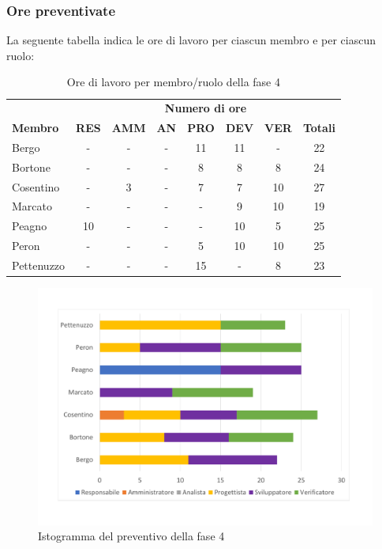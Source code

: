 	\subsubsection{Ore preventivate}
		La seguente tabella indica le ore di lavoro per ciascun membro e per ciascun ruolo:
		\begin{table}[H]
			\centering
			\begin{tabular}{| l | c c c c c c | c |}
				\rowcolor{LightBlue}
				& \multicolumn{7}{c}{\textbf{\color{white}Numero di ore}}	\\
		
				\rowcolor{LightBlue}
				\textbf{\color{white}Membro}
				& \textbf{\color{white}RES}
				& \textbf{\color{white}AMM}
				& \textbf{\color{white}AN}
				& \textbf{\color{white}PRO}
				& \textbf{\color{white}DEV}
				& \textbf{\color{white}VER}
				& \textbf{\color{white}Totali}\\
	
				Bergo      & - & - & - & 11 & 11 & - & 22\\
				Bortone    & - & - & - & 8 & 8 & 8 & 24\\
				Cosentino  & - & 3 & - & 7 & 7 & 10 & 27\\
				Marcato    & - & - & - & - & 9 & 10 & 19\\
				Peagno     & 10 & - & - & - & 10 & 5 & 25\\
				Peron      & - & - & - & 5 & 10 & 10 & 25\\
				Pettenuzzo & - & - & - & 15 & - & 8 & 23\\ \hline
			\end{tabular}
			\caption{Ore di lavoro per membro/ruolo della fase 4}
		\end{table}
		
	\begin{figure}[h]
	\centering
	\includegraphics[scale=0.45]{images/preventivoRA.pdf}
	\caption{Istogramma del preventivo della fase 4}
\end{figure}
		
